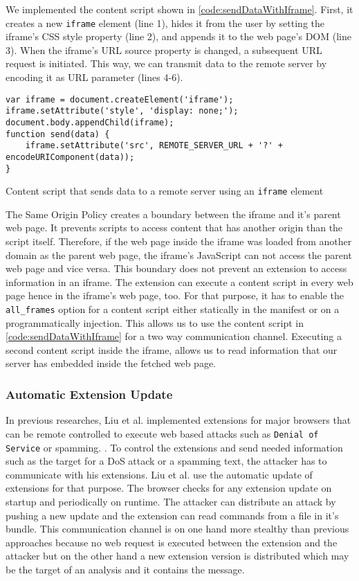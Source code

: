 	We implemented the content script shown in \autoref{code:sendDataWithIframe}. First, it creates a new \texttt{iframe} element (line 1), hides it from the user by setting the iframe's CSS style property (line 2), and appends it to the web page's DOM (line 3). When the iframe's URL source property is changed, a subsequent URL request is initiated. This way, we can transmit data to the remote server by encoding it as URL parameter (lines 4-6).

\begin{code}
	\begin{lstlisting}
var iframe = document.createElement('iframe');
iframe.setAttribute('style', 'display: none;');
document.body.appendChild(iframe);
function send(data) {
	iframe.setAttribute('src', REMOTE_SERVER_URL + '?' + encodeURIComponent(data));
}
	\end{lstlisting}
	\caption{Content script that sends data to a remote server using an \texttt{iframe} element}
	\label{code:sendDataWithIframe}
\end{code}

	The Same Origin Policy creates a boundary between the iframe and it's parent web page. It prevents scripts to access content that has another origin than the script itself. Therefore, if the web page inside the iframe was loaded from another domain as the parent web page, the iframe's JavaScript can not access the parent web page and vice versa. This boundary does not prevent an extension to access information in an iframe. The extension can execute a content script in every web page hence in the iframe's web page, too. For that purpose, it has to enable the \texttt{all\_frames} option for a content script either statically in the manifest or on a programmatically injection. This allows us to use the content script in \autoref{code:sendDataWithIframe} for a two way communication channel. Executing a second content script inside the iframe, allows us to read information that our server has embedded inside the fetched web page. 

\subsubsection{Automatic Extension Update}

	In previous researches, Liu et al. implemented extensions for major browsers that can be remote controlled to execute web based attacks such as \texttt{Denial of Service} or spamming. \cite{liu2011botnet, Liu12chromeextensions:}. To control the extensions and send needed information such as the target for a DoS attack or a spamming text, the attacker has to communicate with his extensions. Liu et al. use the automatic update of extensions for that purpose. The browser checks for any extension update on startup and periodically on runtime. The attacker can distribute an attack by pushing a new update and the extension can read commands from a file in it's bundle. This communication channel is on one hand more stealthy than previous approaches because no web request is executed between the extension and the attacker but on the other hand a new extension version is distributed which may be the target of an analysis and it contains the message. 


